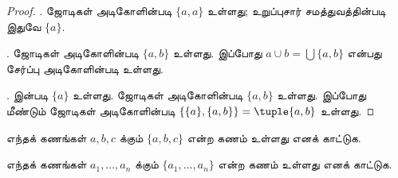 \documentclass[../../../include/open-logic-section]{subfiles}
\begin{document}
\begin{proof}
. ஜோடிகள் அடிகோளின்படி $\{a, a\}$ உள்ளது; உறுப்புசார்
சமத்துவத்தின்படி இதுவே $\{a\}$.

. ஜோடிகள் அடிகோளின்படி $\{a, b\}$ உள்ளது. இப்போது
$a \cup b = \bigcup \{a, b\}$ என்பது சேர்ப்பு அடிகோளின்படி உள்ளது.

.  இன்படி $\{a\}$ உள்ளது. ஜோடிகள்
அடிகோளின்படி $\{a, b\}$ உள்ளது. இப்போது மீண்டும் ஜோடிகள் அடிகோளின்படி
$\{\{a\}, \{a, b\}\} = \tuple{a, b}$ உள்ளது.
\end{proof}

\begin{prob}
எந்தக் கணங்கள் $a, b, c$ க்கும் $\{a, b, c\}$ என்ற கணம் உள்ளது எனக்
காட்டுக.
\end{prob}

\begin{prob}
எந்தக் கணங்கள் $a_1, \ldots, a_n$ க்கும் $\{a_1, \ldots,
a_n\}$ என்ற கணம் உள்ளது எனக் காட்டுக.
\end{prob}

\end{document}
